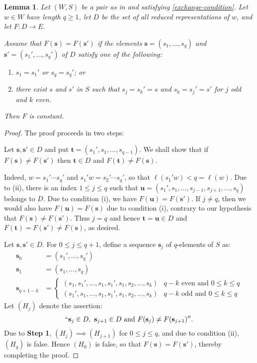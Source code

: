 \documentclass{article}
\theoremstyle{thmstyle}
\newtheorem{lemma}[theorem]{Lemma}
\theoremstyle{defstyle}
\renewcommand{\le}{\leqslant}
\renewcommand{\ge}{\geqslant}
\begin{document}
\begin{lemma}
    Let $(W, S)$ be a pair as in  and satisfying \ref{exchange-condition}. Let $w\in W$ have length $q\ge 1$, let $D$ be the set of all reduced representations of $w$, and let $F: D\to E$.

    Assume that $F(\mathbf s) = F(\mathbf s')$ if the elements $\mathbf s = (s_1,\dots,s_q)$ and $\mathbf s' = (s_1',\dots,s_q')$ of $D$ satisfy one of the following: 
    \begin{enumerate}[label=(\roman*)]
        \item $s_1 = s_1'$ or $s_q = s_q'$; or 
        \item there exist $s$ and $s'$ in $S$ such that $s_j = s_k' = s$ and $s_k = s_j' = s'$ for $j$ odd and $k$ even.
    \end{enumerate}
    Then $F$ is constant.
\end{lemma}
\begin{proof}
The proof proceeds in two steps: 

 Let $\mathbf s, \mathbf s'\in D$ and put $\mathbf t = (s_1', s_1,\dots, s_{q - 1})$. We shall show that if $F(\mathbf s)\ne F(\mathbf s')$ then $\mathbf t\in D$ and $F(\mathbf t)\ne F(\mathbf s)$.

Indeed, $w = s_1'\cdots s_q'$ and $s_1'w = s_2'\cdots s_q'$, so that $\ell(s_1'w) < q = \ell(w)$. Due to  (ii), there is an index $1\le j\le q$ such that $\mathbf u =(s_1',s_1,\dots, s_{j - 1}, s_{j + 1},\dots,s_q)$ belongs to $D$. Due to condition (i), we have $F(\mathbf u) = F(\mathbf s')$. If $j\ne q$, then we would also have $F(\mathbf u) = F(\mathbf s)$ due to condition (i), contrary to our hypothesis that $F(\mathbf s)\ne F(\mathbf s')$. Thus $j = q$ and hence $\mathbf t = \mathbf u\in D$ and $F(\mathbf t) = F(\mathbf s')\ne F(\mathbf s)$, as desired. 

 Let $\mathbf s,\mathbf s'\in D$. For $0\le j\le q + 1$, define a sequence $\mathbf s_j$ of $q$-elements of $S$ as: 
\begin{align*}
    \mathbf s_0 &= (s_1',\dots, s_q')\\
    \mathbf s_1 &= (s_1,\dots,s_q)\\
    \mathbf s_{q + 1 - k} &= \begin{cases}
        (s_1,s_1',\dots,s_1,s_1',s_1,s_2,\dots,s_k) & q - k \text{ even and }0\le k\le q\\
        (s_1',s_1,\dots,s_1, s_1',s_1,s_2,\dots,s_k) & q - k \text{ odd and }0\le k\le q
    \end{cases}
\end{align*}
Let $(H_j)$ denote the assertion: 
\begin{equation*}
    ``\mathbf s_j\in D,~\mathbf s_{j + 1}\in D\text{ and } F(\mathbf s_j)\ne F(\mathbf s_{j + 1})''.
\end{equation*}
Due to \textbf{Step 1}, $(H_j)\implies(H_{j + 1})$ for $0\le j\le q$, and due to condition (ii), $(H_q)$ is false. Hence $(H_0)$ is false, so that $F(\mathbf s) = F(\mathbf s')$, thereby completing the proof.
\end{proof}
\end{document}
